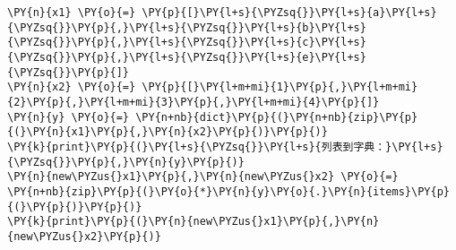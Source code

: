 \begin{Verbatim}[commandchars=\\\{\}]
\PY{n}{x1} \PY{o}{=} \PY{p}{[}\PY{l+s}{\PYZsq{}}\PY{l+s}{a}\PY{l+s}{\PYZsq{}}\PY{p}{,}\PY{l+s}{\PYZsq{}}\PY{l+s}{b}\PY{l+s}{\PYZsq{}}\PY{p}{,}\PY{l+s}{\PYZsq{}}\PY{l+s}{c}\PY{l+s}{\PYZsq{}}\PY{p}{,}\PY{l+s}{\PYZsq{}}\PY{l+s}{e}\PY{l+s}{\PYZsq{}}\PY{p}{]}
\PY{n}{x2} \PY{o}{=} \PY{p}{[}\PY{l+m+mi}{1}\PY{p}{,}\PY{l+m+mi}{2}\PY{p}{,}\PY{l+m+mi}{3}\PY{p}{,}\PY{l+m+mi}{4}\PY{p}{]}
\PY{n}{y} \PY{o}{=} \PY{n+nb}{dict}\PY{p}{(}\PY{n+nb}{zip}\PY{p}{(}\PY{n}{x1}\PY{p}{,}\PY{n}{x2}\PY{p}{)}\PY{p}{)}
\PY{k}{print}\PY{p}{(}\PY{l+s}{\PYZsq{}}\PY{l+s}{列表到字典：}\PY{l+s}{\PYZsq{}}\PY{p}{,}\PY{n}{y}\PY{p}{)}
\PY{n}{new\PYZus{}x1}\PY{p}{,}\PY{n}{new\PYZus{}x2} \PY{o}{=} \PY{n+nb}{zip}\PY{p}{(}\PY{o}{*}\PY{n}{y}\PY{o}{.}\PY{n}{items}\PY{p}{(}\PY{p}{)}\PY{p}{)}
\PY{k}{print}\PY{p}{(}\PY{n}{new\PYZus{}x1}\PY{p}{,}\PY{n}{new\PYZus{}x2}\PY{p}{)}
\end{Verbatim}

